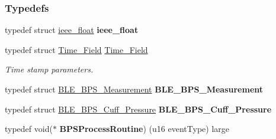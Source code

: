 \subsubsection*{Typedefs}
\begin{DoxyCompactItemize}
\item 
typedef struct \hyperlink{structieee__float}{ieee\+\_\+float} {\bfseries ieee\+\_\+float}\hypertarget{group___b_l_e___b_p_s_gaa6d44d8adbf4d430a499f003547ab06b}{}\label{group___b_l_e___b_p_s_gaa6d44d8adbf4d430a499f003547ab06b}

\item 
typedef struct \hyperlink{struct_time___field}{Time\+\_\+\+Field} \hyperlink{group___b_l_e___b_p_s_ga8d554aac0512406a308b84a3392623fa}{Time\+\_\+\+Field}\hypertarget{group___b_l_e___b_p_s_ga8d554aac0512406a308b84a3392623fa}{}\label{group___b_l_e___b_p_s_ga8d554aac0512406a308b84a3392623fa}

\begin{DoxyCompactList}\small\item\em Time stamp parameters. \end{DoxyCompactList}\item 
typedef struct \hyperlink{struct_b_l_e___b_p_s___measurement}{B\+L\+E\+\_\+\+B\+P\+S\+\_\+\+Measurement} {\bfseries B\+L\+E\+\_\+\+B\+P\+S\+\_\+\+Measurement}\hypertarget{group___b_l_e___b_p_s_ga20be876c85165a407f0be853ebd915ad}{}\label{group___b_l_e___b_p_s_ga20be876c85165a407f0be853ebd915ad}

\item 
typedef struct \hyperlink{struct_b_l_e___b_p_s___cuff___pressure}{B\+L\+E\+\_\+\+B\+P\+S\+\_\+\+Cuff\+\_\+\+Pressure} {\bfseries B\+L\+E\+\_\+\+B\+P\+S\+\_\+\+Cuff\+\_\+\+Pressure}\hypertarget{group___b_l_e___b_p_s_ga3a7e83d5f82f6eb23b5bacb33bae570a}{}\label{group___b_l_e___b_p_s_ga3a7e83d5f82f6eb23b5bacb33bae570a}

\item 
typedef void($\ast$ {\bfseries B\+P\+S\+Process\+Routine}) (u16 event\+Type) large\hypertarget{group___b_l_e___b_p_s_ga3e547727e55da97b9b9a680f0a990ef0}{}\label{group___b_l_e___b_p_s_ga3e547727e55da97b9b9a680f0a990ef0}

\end{DoxyCompactItemize}
